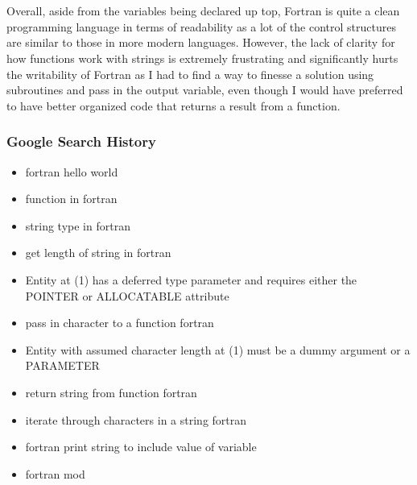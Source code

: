 \documentclass[letterpaper, 10pt, DIV=13]{scrartcl}
\numberwithin{equation}{section}
\numberwithin{figure}{section}
\numberwithin{table}{section}
\begin{document}
\\ \\
Overall, aside from the variables being declared up top, Fortran is quite a clean programming language in terms of readability as a lot of the control structures are similar to those in more modern languages. However, the lack of clarity for how functions work with strings is extremely frustrating and significantly hurts the writability of Fortran as I had to find a way to finesse a solution using subroutines and pass in the output variable, even though I would have preferred to have better organized code that returns a result from a function.

\subsubsection{Google Search History}

\begin{itemize}
	\item fortran hello world
	\item function in fortran
	\item string type in fortran
	\item get length of string in fortran
	\item Entity at (1) has a deferred type parameter and requires either the POINTER or ALLOCATABLE attribute
	\item pass in character to a function fortran
	\item Entity with assumed character length at (1) must be a dummy argument or a PARAMETER
	\item return string from function fortran
	\item iterate through characters in a string fortran
	\item fortran print string to include value of variable
	\item fortran mod
\end{itemize}
\end{document}
